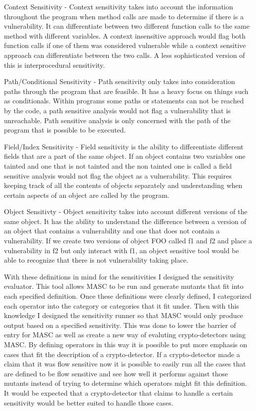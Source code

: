 Context Sensitivity - Context sensitivity takes into account the information throughout the program when method calls are made to determine if there is a vulnerability. It can differentiate between two different function calls to the same method with different variables. A context insensitive approach would flag both function calls if one of them was considered vulnerable while a context sensitive approach can differentiate between the two calls. A less sophisticated version of this is interprocedural sensitivity.

Path/Conditional Sensitivity - Path sensitivity only takes into consideration paths through the program that are feasible. It has a heavy focus on things such as conditionals. Within programs some paths or statements can not be reached by the code, a path sensitive analysis would not flag a vulnerability that is unreachable. Path sensitive analysis is only concerned with the path of the program that is possible to be executed.

Field/Index Sensitivity - Field sensitivity is the ability to differentiate different fields that are a part of the same object. If an object contains two variables one tainted and one that is not tainted and the non tainted one is called a field sensitive analysis would not flag the object as a vulnerability. This requires keeping track of all the contents of objects separately and understanding when certain aspects of an object are called by the program.
    
Object Sensitivty - Object sensitivity takes into account different versions of the same object. It has the ability to understand the difference between a version of an object that contains a vulnerability and one that does not contain a vulnerability. If we create two versions of object FOO called f1 and f2 and place a vulnerability in f2 but only interact with f1, an object sensitive tool would be able to recognize that there is not vulnerability taking place.

With these definitions in mind for the sensitivities I designed the sensitivity evaluator. This tool allows MASC to be run and generate mutants that fit into each specified definition. Once these definitions were clearly defined, I categorized each operator into the category or categories that it fit under. Then with this knowledge I designed the sensitivity runner so that MASC would only produce output based on a specified sensitivity. This was done to lower the barrier of entry for MASC as well as create a new way of evaluting crypto-detectors using MASC. By defining operators in this way it is possible to put more emphasis on cases that fit the description of a crypto-detector. If a crypto-detector made a claim that it was flow sensitive now it is possible to easily run all the cases that are defined to be flow sensitive and see how well it performs against those mutants instead of trying to determine which operators might fit this definition. It would be expected that a crypto-detector that claims to handle a certain sensitivity would be better suited to handle those cases. 


